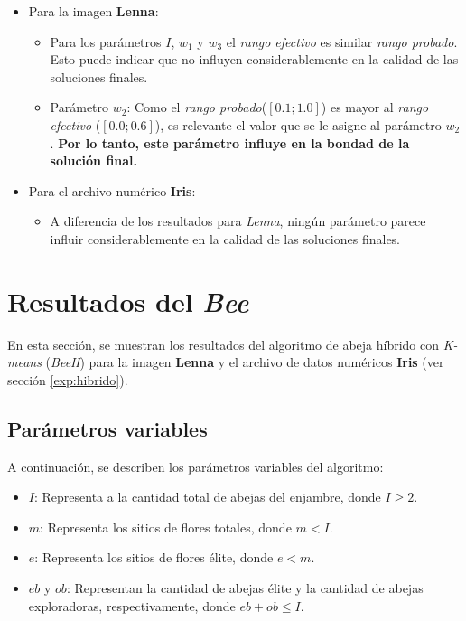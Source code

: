 \begin{itemize}
    \item Para la imagen {\bf Lenna}:
		\begin{itemize}
		    \item Para los parámetros $I$, $w_1$ y $w_3$ el \emph{rango efectivo}
				  es similar \emph{rango probado}. Esto
		          puede indicar que no influyen considerablemente en la calidad
		          de las soluciones finales.
		    \item Parámetro $w_2$:
		          Como el \emph{rango probado}($[0.1; 1.0]$) es
		          mayor al \emph{rango efectivo} ($[0.0;0.6]$), es relevante el valor que se
		          le asigne al parámetro $w_2$. \textbf{Por lo tanto, este
		          parámetro influye en la bondad de la solución final.}
		\end{itemize}
    \item Para el archivo numérico {\bf Iris}:
		\begin{itemize}
		    \item A diferencia de los resultados para \emph{Lenna}, ningún
		    parámetro parece influir considerablemente en la calidad de las
		    soluciones finales.
		\end{itemize}
\end{itemize}

\section{Resultados del \emph{Bee}}

    En esta sección, se muestran los resultados del algoritmo de abeja híbrido con
\emph{K-means} (\emph{BeeH}) para la imagen \textbf{Lenna} y el archivo de datos
numéricos \textbf{Iris} (ver sección \ref{exp:hibrido}).

\subsection{Parámetros variables}\label{sect:ibee-pv}

    A continuación, se describen los parámetros variables del algoritmo:
\begin{itemize}
    \item $I$: Representa a la cantidad total de abejas del enjambre,
donde $I \geq 2$.
    \item $m$: Representa los sitios de flores totales, donde $m < I$.
    \item $e$: Representa los sitios de flores élite, donde $e < m$.
    \item $eb$ y $ob$: Representan la cantidad de abejas élite y la cantidad de
abejas exploradoras, respectivamente, donde $eb + ob \leq I$.
\end{itemize}

